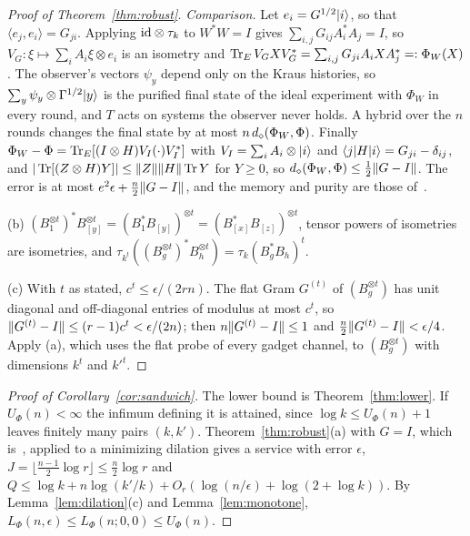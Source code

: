 \begin{proof}[Proof of Theorem~\ref{thm:robust}]
\emph{Comparison.} Let $e_i=G^{1/2}\lvert i\rangle$, so that $\langle e_j,e_i\rangle=G_{ji}$. Applying $\mathrm{id}\otimes\tau_k$ to $W^*W=I$ gives $\sum_{i,j}G_{ij}A_i^*A_j=I$, so
$V_G:\xi\mapsto\sum_iA_i\xi\otimes e_i$ is an isometry and $\operatorname{Tr}_EV_GXV_G^*=\sum_{i,j}G_{ji}A_iXA_j^*=:\Phi_W(X)$. The observer's vectors $\psi_y$ depend only on
the Kraus histories, so $\sum_y\psi_y\otimes\Gamma^{1/2}\lvert y\rangle$ is the purified final state of the ideal experiment with $\Phi_W$ in every round, and $T$ acts on
systems the observer never holds. A hybrid over the $n$ rounds changes the final state by at most $n\,d_\diamond(\Phi_W,\Phi)$. Finally
$\Phi_W-\Phi=\operatorname{Tr}_E[(I\otimes H)V_I(\cdot)V_I^*]$ with $V_I=\sum_iA_i\otimes\lvert i\rangle$ and $\langle j\rvert H\lvert i\rangle=G_{ji}-\delta_{ij}$, and $|\operatorname{Tr}[(Z\otimes H)Y]|\le\lVert Z\rVert\lVert H\rVert\operatorname{Tr} Y$
for $Y\ge0$, so $d_\diamond(\Phi_W,\Phi)\le\frac12\lVert G-I\rVert$. The error is at most $e^2\epsilon+\frac n2\lVert G-I\rVert$, and the memory and purity are those
of~\cite[Theorem~12.2]{DouglasMghirbiC}.

(b) $(B_1^{\otimes t})^*B_{[y]}^{\otimes t}=(B_1^*B_{[y]})^{\otimes t}=(B_{[x]}^*B_{[z]})^{\otimes t}$, tensor powers of isometries are isometries, and
$\tau_{k^t}((B_g^{\otimes t})^*B_h^{\otimes t})=\tau_k(B_g^*B_h)^t$.

(c) With $t$ as stated, $c^t\le\epsilon/(2rn)$. The flat Gram $G^{(t)}$ of $(B_g^{\otimes t})$ has unit diagonal and off-diagonal entries of modulus at most $c^t$,
so $\lVert G^{(t)}-I\rVert\le(r-1)c^t<\epsilon/(2n)$; then $n\lVert G^{(t)}-I\rVert\le1$ and $\frac n2\lVert G^{(t)}-I\rVert<\epsilon/4$. Apply (a), which uses the flat probe of every
gadget channel, to $(B_g^{\otimes t})$ with dimensions $k^t$ and $k'^t$.
\end{proof}

\begin{proof}[Proof of Corollary~\ref{cor:sandwich}]
The lower bound is Theorem~\ref{thm:lower}. If $U_\Phi(n)<\infty$ the infimum defining it is attained, since $\log k\le U_\Phi(n)+1$ leaves finitely many pairs
$(k,k')$. Theorem~\ref{thm:robust}(a) with $G=I$, which is~\cite[Theorem~12.2]{DouglasMghirbiC}, applied to a minimizing dilation gives a service with error
$\epsilon$, $J=\lfloor\frac{n-1}2\log r\rfloor\le\frac n2\log r$ and $Q\le\log k+n\log(k'/k)+O_r(\log(n/\epsilon)+\log(2+\log k))$. By
Lemma~\ref{lem:dilation}(c) and Lemma~\ref{lem:monotone}, $L_\Phi(n,\epsilon)\le L_\Phi(n;0,0)\le U_\Phi(n)$.
\end{proof}

